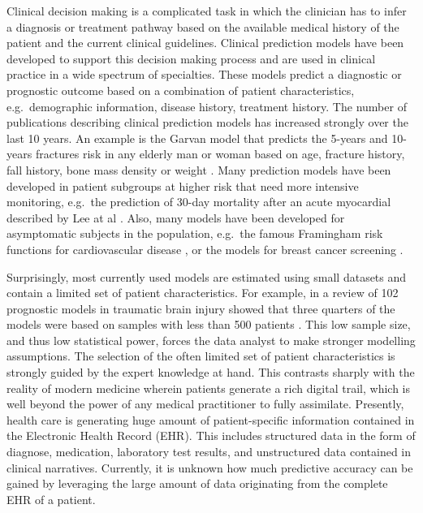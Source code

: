 \documentclass[]{book}
\begin{document}
Clinical decision making is a complicated task in which the clinician
has to infer a diagnosis or treatment pathway based on the available
medical history of the patient and the current clinical guidelines.
Clinical prediction models have been developed to support this decision
making process and are used in clinical practice in a wide spectrum of
specialties. These models predict a diagnostic or prognostic outcome
based on a combination of patient characteristics, e.g.~demographic
information, disease history, treatment history. The number of
publications describing clinical prediction models has increased
strongly over the last 10 years. An example is the Garvan model that
predicts the 5-years and 10-years fractures risk in any elderly man or
woman based on age, fracture history, fall history, bone mass density or
weight \citet{nguyen2008}. Many prediction models have been developed in
patient subgroups at higher risk that need more intensive monitoring,
e.g.~the prediction of 30-day mortality after an acute myocardial
described by Lee at al \citet{lee1995}. Also, many models have been
developed for asymptomatic subjects in the population, e.g.~the famous
Framingham risk functions for cardiovascular disease \citet{wilson1998},
or the models for breast cancer screening \citet{engel2015}.

Surprisingly, most currently used models are estimated using small
datasets and contain a limited set of patient characteristics. For
example, in a review of 102 prognostic models in traumatic brain injury
showed that three quarters of the models were based on samples with less
than 500 patients \citet{perel2006}. This low sample size, and thus low
statistical power, forces the data analyst to make stronger modelling
assumptions. The selection of the often limited set of patient
characteristics is strongly guided by the expert knowledge at hand. This
contrasts sharply with the reality of modern medicine wherein patients
generate a rich digital trail, which is well beyond the power of any
medical practitioner to fully assimilate. Presently, health care is
generating huge amount of patient-specific information contained in the
Electronic Health Record (EHR). This includes structured data in the
form of diagnose, medication, laboratory test results, and unstructured
data contained in clinical narratives. Currently, it is unknown how much
predictive accuracy can be gained by leveraging the large amount of data
originating from the complete EHR of a patient.
\end{document}
